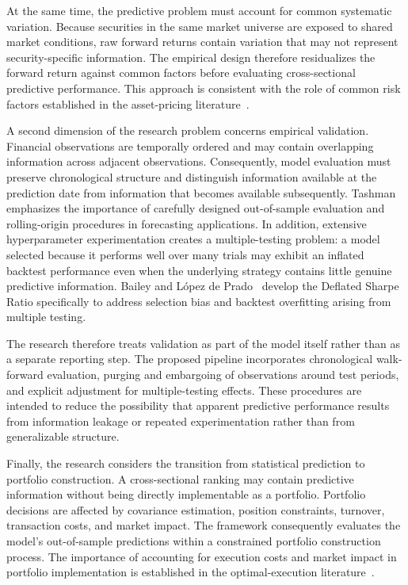 \medskip

At the same time, the predictive problem must account for common systematic variation. Because securities in the same market universe are exposed to shared market conditions, raw forward returns contain variation that may not represent security-specific information. The empirical design therefore residualizes the forward return against common factors before evaluating cross-sectional predictive performance. This approach is consistent with the role of common risk factors established in the asset-pricing literature~\cite{FamaFrench1992,FamaFrench1993}.

\medskip

A second dimension of the research problem concerns empirical validation. Financial observations are temporally ordered and may contain overlapping information across adjacent observations. Consequently, model evaluation must preserve chronological structure and distinguish information available at the prediction date from information that becomes available subsequently. Tashman~\cite{Tashman2000} emphasizes the importance of carefully designed out-of-sample evaluation and rolling-origin procedures in forecasting applications. In addition, extensive hyperparameter experimentation creates a multiple-testing problem: a model selected because it performs well over many trials may exhibit an inflated backtest performance even when the underlying strategy contains little genuine predictive information. Bailey and López de Prado~\cite{BaileyLopezDePrado2014} develop the Deflated Sharpe Ratio specifically to address selection bias and backtest overfitting arising from multiple testing.

\medskip

The research therefore treats validation as part of the model itself rather than as a separate reporting step. The proposed pipeline incorporates chronological walk-forward evaluation, purging and embargoing of observations around test periods, and explicit adjustment for multiple-testing effects. These procedures are intended to reduce the possibility that apparent predictive performance results from information leakage or repeated experimentation rather than from generalizable structure.

\medskip

Finally, the research considers the transition from statistical prediction to portfolio construction. A cross-sectional ranking may contain predictive information without being directly implementable as a portfolio. Portfolio decisions are affected by covariance estimation, position constraints, turnover, transaction costs, and market impact. The framework consequently evaluates the model's out-of-sample predictions within a constrained portfolio construction process. The importance of accounting for execution costs and market impact in portfolio implementation is established in the optimal-execution literature~\cite{AlmgrenChriss2000}.

